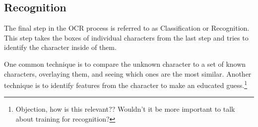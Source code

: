 \documentclass[sigplan,screen,nonacm]{acmart-tagged}
\begin{document}



\subsection{Recognition}
\label{Recognition}

The final step in the OCR process is referred to as Classification or Recognition. This step takes the boxes of individual characters from the last step and tries to identify the character inside of them.

One common technique is to compare the unknown character to a set of known characters, overlaying them, and seeing which ones are the most similar. Another technique is to identify features from the character to make an educated guess.\citep{Thorat:2022}\footnote{Objection, how is this relevant?? Wouldn't it be more important to talk about training for recognition?}

%
\end{document}
